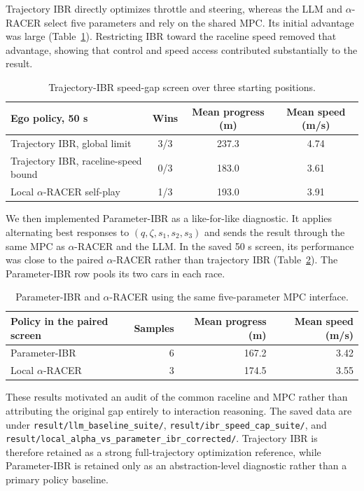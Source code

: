 \documentclass[11pt]{article}
\begin{document}
Trajectory IBR directly optimizes throttle and steering, whereas the LLM and
$\alpha$-RACER select five parameters and rely on the shared MPC. Its initial
advantage was large (Table~\ref{tab:trajectory-ibr-speed}). Restricting IBR
toward the raceline speed removed that advantage, showing that control and speed
access contributed substantially to the result.

\begin{table}[ht]
  \centering
  \small
  \begin{tabular}{lccc}
    \toprule
    Ego policy, 50 s & Wins & Mean progress (m) & Mean speed (m/s) \\
    \midrule
    Trajectory IBR, global limit & 3/3 & 237.3 & 4.74 \\
    Trajectory IBR, raceline-speed bound & 0/3 & 183.0 & 3.61 \\
    Local $\alpha$-RACER self-play & 1/3 & 193.0 & 3.91 \\
    \bottomrule
  \end{tabular}
  \caption{Trajectory-IBR speed-gap screen over three starting positions.}
  \label{tab:trajectory-ibr-speed}
\end{table}

We then implemented Parameter-IBR as a like-for-like diagnostic. It applies
alternating best responses to $(q,\zeta,s_1,s_2,s_3)$ and sends the result
through the same MPC as $\alpha$-RACER and the LLM. In the saved 50 s screen,
its performance was close to the paired $\alpha$-RACER rather than trajectory
IBR (Table~\ref{tab:parameter-ibr-screen}). The Parameter-IBR row pools its two
cars in each race.

\begin{table}[ht]
  \centering
  \small
  \begin{tabular}{lrrr}
    \toprule
    Policy in the paired screen & Samples & Mean progress (m) & Mean speed (m/s) \\
    \midrule
    Parameter-IBR & 6 & 167.2 & 3.42 \\
    Local $\alpha$-RACER & 3 & 174.5 & 3.55 \\
    \bottomrule
  \end{tabular}
  \caption{Parameter-IBR and $\alpha$-RACER using the same five-parameter MPC
  interface.}
  \label{tab:parameter-ibr-screen}
\end{table}

These results motivated an audit of the common raceline and MPC rather than
attributing the original gap entirely to interaction reasoning. The saved data
are under \texttt{result/llm\_baseline\_suite/},
\texttt{result/ibr\_speed\_cap\_suite/}, and
\texttt{result/local\_alpha\_vs\_parameter\_ibr\_corrected/}.
Trajectory IBR is therefore retained as a strong full-trajectory optimization
reference, while Parameter-IBR is retained only as an abstraction-level
diagnostic rather than a primary policy baseline.
\end{document}
